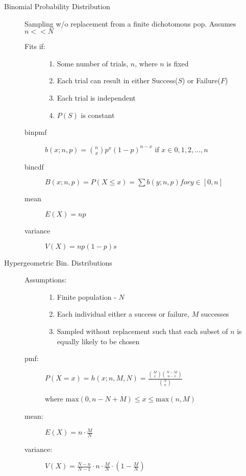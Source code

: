 \documentclass[12pt]{letter}
\begin{document}
\begin{multicols}{2}
\begin{description}
  \item[Binomial Probability Distribution]
    Sampling w/o replacement from a finite dichotomous pop.
    Assumes $n << N$
      

    \begin{description}
    \item[Fits if:]
      \begin{enumerate}
      \item Some number of trials, $n$, where $n$ is fixed
      \item Each trial can result in either Success($S$) or Failure($F$)
      \item Each trial is independent
      \item $P(S)$ is constant
      \end{enumerate}
    \item[binpmf] $b(x; n,p) = {n \choose x} p^x (1 - p)^{n-x}$ if $x \in 0,1,2,\ldots,n$
    \item[bincdf] $B(x; n,p) = P(X \leq x) = \sum b(y; n,p) for y \in [0,n]$
    \item[mean] $E(X) = np$
    \item[variance] $V(X) = np(1-p)s$
    \end{description}

  \item[Hypergeometric Bin. Distributions]
    \begin{description}
    \item[Assumptions:]
      \begin{enumerate}
      \item Finite population - $N$
      \item Each individual either a success or failure, $M$ successes
      \item Sampled without replacement such that each subset of $n$ is equally likely to be chosen
      \end{enumerate}
    \item[pmf:] $P(X = x) = h(x; n,M,N) = \frac{{M \choose x} {N-M \choose n-x} }{ {N \choose n} }$
    
      where $\mathrm{max}(0, n-N+M) \leq x \leq \mathrm{max}(n,M)$
    \item[mean:] $E(X) = n \cdot \frac{M}{N}$
    \item[variance:] $V(X) = \frac{N-n}{N-1} \cdot n \cdot \frac{M}{N} \cdot \left( 1 - \frac{M}{N}\right)$
    \end{description}


\end{description}
\end{multicols}
\end{document}

